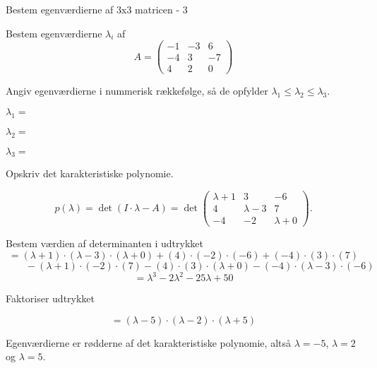 \documentclass{article}
\begin{document}
\begin{exercise}{Bestem egenværdierne af 3x3 matricen - 3}

Bestem egenværdierne $\lambda_i$ af 
\[
A=\begin{pmatrix}
-1 & -3 & 6 \\
-4 & 3 & -7 \\
4 & 2 & 0
\end{pmatrix}
\]

Angiv egenværdierne i nummerisk rækkefølge, så de
opfylder $\lambda_1 \le \lambda_2 \le \lambda_3$.

$\lambda_1 = $ 

$\lambda_2 = $ 

$\lambda_3 = $ 

\hint
Opskriv det karakteristiske polynomie.

\hint
\[
p(\lambda)=\det\left(I \cdot \lambda - A \right)=\det\begin{pmatrix}
\lambda + 1 & 3 & -6 \\
4 & \lambda - 3 & 7 \\
-4 & -2 & \lambda + 0
\end{pmatrix}.
\]

\hint
Bestem værdien af determinanten i udtrykket
\[
=(\lambda+1) \cdot (\lambda-3) \cdot (\lambda+0)+(4) \cdot (-2) \cdot (-6)+(-4) \cdot (3) \cdot (7)
\]
\[
\qquad -(\lambda+1) \cdot (-2) \cdot (7)-(4) \cdot (3) \cdot (\lambda+0)-(-4) \cdot (\lambda-3) \cdot (-6)
\]
\[
=\lambda^3-2\lambda^2-25\lambda+50
\]

\hint
Faktoriser udtrykket

\hint
\[
=(\lambda-5) \cdot (\lambda-2) \cdot (\lambda+5)
\]

\hint
Egenværdierne er rødderne af det karakteristiske polynomie, 
altså
$\lambda=-5$, $\lambda=2$ og $\lambda=5$.

\end{exercise}
\end{document}
